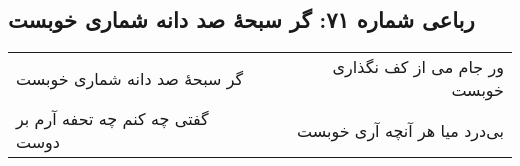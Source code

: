\begin{center}
\section*{رباعی شماره ۷۱: گر سبحهٔ صد دانه شماری خوبست}
\label{sec:sh071}
\begin{longtable}{l p{0.5cm} r}
گر سبحهٔ صد دانه شماری خوبست
&&
ور جام می از کف نگذاری خوبست
\\
گفتی چه کنم چه تحفه آرم بر دوست
&&
بی‌درد میا هر آنچه آری خوبست
\\
\end{longtable}
\end{center}
